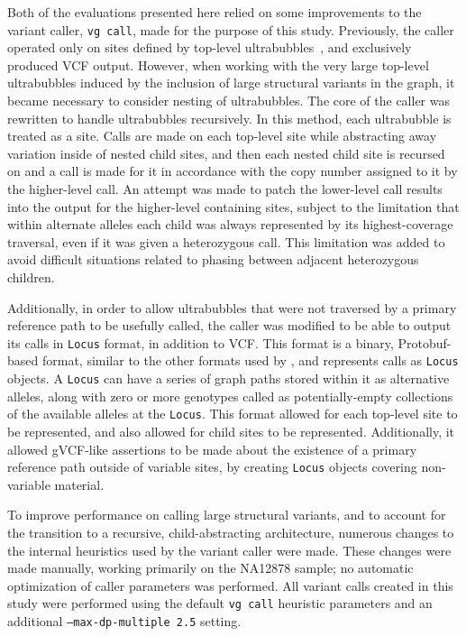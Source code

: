 Both of the evaluations presented here relied on some improvements to the \vg variant caller, \texttt{vg call}, made for the purpose of this study. Previously, the caller operated only on sites defined by top-level ultrabubbles~\cite{paten2017superbubbles}, and exclusively produced VCF output. However, when working with the very large top-level ultrabubbles induced by the inclusion of large structural variants in the graph, it became necessary to consider nesting of ultrabubbles. The core of the caller was rewritten to handle ultrabubbles recursively. In this method, each ultrabubble is treated as a site. Calls are made on each top-level site while abstracting away variation inside of nested child sites, and then each nested child site is recursed on and a call is made for it in accordance with the copy number assigned to it by the higher-level call. An attempt was made to patch the lower-level call results into the output for the higher-level containing sites, subject to the limitation that within alternate alleles each child was always represented by its highest-coverage traversal, even if it was given a heterozygous call. This limitation was added to avoid difficult situations related to phasing between adjacent heterozygous children.

Additionally, in order to allow ultrabubbles that were not traversed by a primary reference path to be usefully called, the caller was modified to be able to output its calls in \texttt{Locus} format, in addition to VCF. This format is a binary, Protobuf-based format, similar to the other formats used by \vg, and represents calls as \texttt{Locus} objects. A \texttt{Locus} can have a series of graph paths stored within it as alternative alleles, along with zero or more genotypes called as potentially-empty collections of the available alleles at the \texttt{Locus}. This format allowed for each top-level site to be represented, and also allowed for child sites to be represented. Additionally, it allowed gVCF-like assertions to be made about the existence of a primary reference path outside of variable sites, by creating \texttt{Locus} objects covering non-variable material.

To improve performance on calling large structural variants, and to account for the transition to a recursive, child-abstracting architecture, numerous changes to the internal heuristics used by the variant caller were made. These changes were made manually, working primarily on the NA12878 sample; no automatic optimization of caller parameters was performed. All variant calls created in this study were performed using the default \texttt{vg call} heuristic parameters and an additional \texttt{--max-dp-multiple 2.5} setting.

